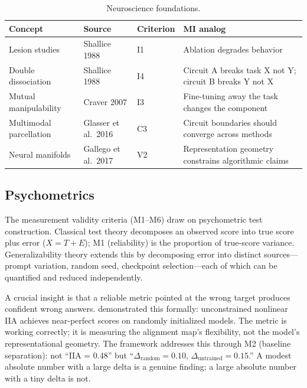 \documentclass[10pt]{article}
\begin{document}
\begin{table}[H]
\centering\small
\caption{Neuroscience foundations.}
\renewcommand{\arraystretch}{1.12}
\begin{tabular}{@{}l>{\raggedright\arraybackslash}p{2cm}l>{\raggedright\arraybackslash}p{4.5cm}@{}}
\toprule
\textbf{Concept} & \textbf{Source} & \textbf{Criterion} & \textbf{MI analog} \\
\midrule
Lesion studies & Shallice 1988 & I1 & Ablation degrades behavior \\
\midrule
Double dissociation & Shallice 1988 & I4 & Circuit A breaks task X not Y; circuit B breaks Y not X \\
\midrule
Mutual manipulability & Craver 2007 & I3 & Fine-tuning away the task changes the component \\
\midrule
Multimodal parcellation & Glasser et al.\ 2016 & C3 & Circuit boundaries should converge across methods \\
\midrule
Neural manifolds & Gallego et al.\ 2017 & V2 & Representation geometry constrains algorithmic claims \\
\bottomrule
\end{tabular}
\end{table}

\subsection{Psychometrics}
\label{sec:psychometrics}

The measurement validity criteria (M1--M6) draw on psychometric test construction. Classical test theory decomposes an observed score into true score plus error ($X = T + E$); M1 (reliability) is the proportion of true-score variance. Generalizability theory extends this by decomposing error into distinct sources---prompt variation, random seed, checkpoint selection---each of which can be quantified and reduced independently.

A crucial insight is that a reliable metric pointed at the wrong target produces confident wrong answers. \citet{sutter2025nonlinear} demonstrated this formally: unconstrained nonlinear IIA achieves near-perfect scores on randomly initialized models. The metric is working correctly; it is measuring the alignment map's flexibility, not the model's representational geometry. The framework addresses this through M2 (baseline separation): not ``IIA = 0.48'' but ``$\Delta_{\text{random}} = 0.10$, $\Delta_{\text{untrained}} = 0.15$.'' A modest absolute number with a large delta is a genuine finding; a large absolute number with a tiny delta is not.
\end{document}
